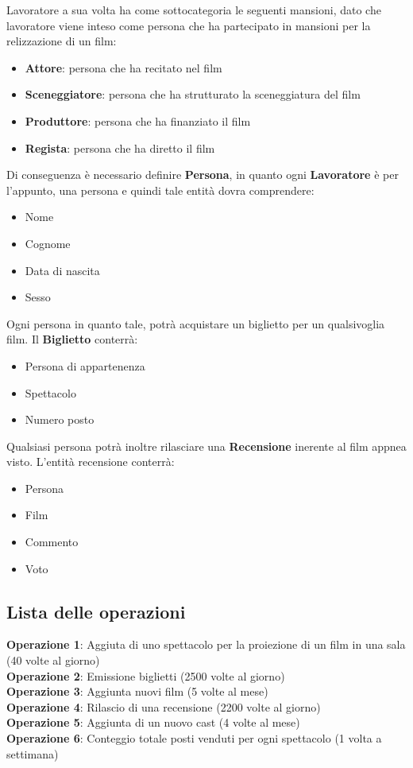 \documentclass[10pt]{article}
\begin{document}
	Lavoratore a sua volta ha come sottocategoria le seguenti mansioni, dato che lavoratore viene inteso come persona che ha partecipato in mansioni per la relizzazione di un film:
	\begin{itemize}
		\item {\bf Attore}: persona che ha recitato nel film 
		\item {\bf Sceneggiatore}: persona che ha strutturato la sceneggiatura del film 
		\item {\bf Produttore}: persona che ha finanziato il film 
		\item {\bf Regista}: persona che ha diretto il film
	\end{itemize}		 
	Di conseguenza è necessario definire {\bf Persona}, in quanto ogni {\bf Lavoratore} è per l'appunto, una persona e quindi tale entità dovra comprendere:
	\begin{itemize}
		\item Nome
		\item Cognome
		\item Data di nascita
		\item Sesso
	\end{itemize}
	Ogni persona in quanto tale, potrà acquistare un biglietto per un qualsivoglia film. Il {\bf Biglietto} conterrà:
	\begin{itemize}
		\item Persona di appartenenza
		\item Spettacolo
		\item Numero posto
	\end{itemize}
	Qualsiasi persona potrà inoltre rilasciare una {\bf Recensione} inerente al film appnea visto. L'entità recensione conterrà:
	\begin{itemize}
		\item Persona
		\item Film
		\item Commento
		\item Voto
	\end{itemize}
 	\subsection{Lista delle operazioni}		
	\textbf{Operazione 1}: Aggiuta di uno spettacolo per la proiezione di un film in una sala (40 volte al giorno) \\
	\textbf{Operazione 2}: Emissione biglietti (2500 volte al giorno)\\
	\textbf{Operazione 3}: Aggiunta nuovi film (5 volte al mese)\\
	\textbf{Operazione 4}: Rilascio di una recensione (2200 volte al giorno)\\
	\textbf{Operazione 5}: Aggiunta di un nuovo cast (4 volte al mese)\\
	\textbf{Operazione 6}: Conteggio totale posti venduti per ogni spettacolo (1 volta a settimana)
\end{document}
